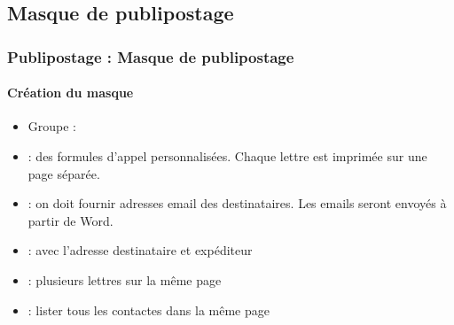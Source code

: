 \documentclass[xcolor=table]{beamer}
\begin{document}
\subsection{Masque de publipostage}

\begin{frame}
\frametitle{Publipostage : Masque de publipostage}
\framesubtitle{Création du masque}

\begin{minipage}{0.74\textwidth}
	\begin{itemize}
		\item Groupe : 
	\end{itemize}
\end{minipage}
\begin{minipage}{0.25\textwidth}
\end{minipage}

\begin{itemize}
	\item {} : des formules d'appel personnalisées. Chaque lettre est imprimée sur une page séparée. 
	\item {} : on doit fournir adresses email des destinataires. Les emails seront envoyés à partir de Word.
	\item {} : avec l'adresse destinataire et expéditeur
	\item {} : plusieurs lettres sur la même page
	\item {} : lister tous les contactes dans la même page
\end{itemize}

\end{frame}
\end{document}
